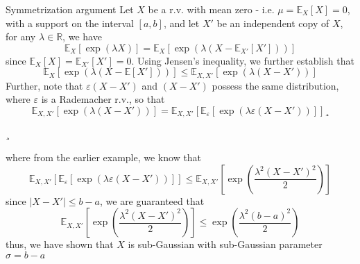 \documentclass[10pt,handout,english]{beamer}
\newcommand{\E}{\mathbb{E}}
\begin{document}
\begin{frame}
\begin{block}{Symmetrization argument}
Let $X$ be a r.v. with mean zero - i.e. $\mu=\E_X[X]=0$, with a support on the interval $[a,b]$, and let $X'$ be an independent copy of $X$, for any $\lambda\in\mathbb{R}$, we have
\[
\E_X[\exp(\lambda X)]=\E_X[\exp(\lambda(X-\E_{X'}[X']))]
\]
since $\E_X[X]=\E_{X'}[X']=0$. Using Jensen's inequality, we further establish that
\[
\E_X[\exp(\lambda(X-\E[X']))]\leq \E_{X,X'}[\exp(\lambda(X-X'))] 
\]
Further, note that $\varepsilon(X-X')$ and $(X-X')$ possess the same distribution, where $\varepsilon$ is a Rademacher r.v., so that
\[
\E_{X,X'}[\exp(\lambda(X-X'))]=\E_{X,X'}[\E_{\varepsilon}[\exp(\lambda\varepsilon(X-X'))]]¸
\]
\end{block}
\end{frame}
\begin{frame}¸
\begin{block}{}
where from the earlier example, we know that
\[
\E_{X,X'}[\E_{\varepsilon}[\exp(\lambda\varepsilon(X-X'))]]\leq \E_{X,X'}\left[\exp\left(\frac{\lambda^2(X-X')^2}{2}\right)\right]
\]
since $\lvert X-X' \rvert\leq b-a$, we are guaranteed that
\[
\E_{X,X'}\left[\exp\left(\frac{\lambda^2(X-X')^2}{2}\right)\right]\leq\exp\left(\frac{\lambda^2(b-a)^2}{2}\right)
\]
thus, we have shown that $X$ is sub-Gaussian with sub-Gaussian parameter $\sigma=b-a$
\end{block}
\end{frame}
\end{document}
